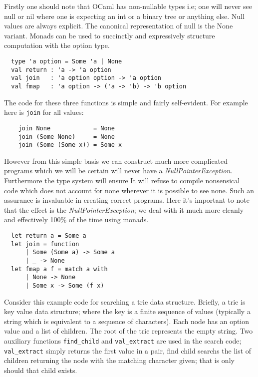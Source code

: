 Firstly one should note that OCaml has non-nullable types
i.e; one will never see null or nil where one is expecting an
int or a binary tree or anything else.
Null values are always explicit.
The canonical representation of null is the None variant.
Monads can be used to succinctly and expressively structure computation with the option type.

\begin{verbatim}
  type 'a option = Some 'a | None
  val return : 'a -> 'a option
  val join   : 'a option option -> 'a option
  val fmap   : 'a option -> ('a -> 'b) -> 'b option
\end{verbatim}

The code for these three functions is simple and fairly self-evident.
For example here is \texttt{join} for all values:
\begin{verbatim}
    join None            = None
    join (Some None)     = None
    join (Some (Some x)) = Some x
\end{verbatim}

However from this simple basis we can construct much more complicated programs which we
will be certain will never have a \textit{NullPointerException}.
Furthermore the type system will ensure 
It will refuse to compile nonsensical code which does not account for none
wherever it is possible to see none.
Such an assurance is invaluable in creating correct programs.
Here it's important to note that the effect is the \textit{NullPointerException};
we deal with it much more cleanly and effectively 100\% of the time using monads.

\begin{verbatim}
  let return a = Some a
  let join = function
      | Some (Some a) -> Some a
      | _ -> None
  let fmap a f = match a with
      | None -> None
      | Some x -> Some (f x)
\end{verbatim}

Consider this example code for searching a trie data structure.
Briefly, a trie is key value data structure;
where the key is a finite sequence of values
(typically a string which is equivalent to a sequence of characters).
Each node has an option value and a list of children.
The root of the trie represents the empty string.
Two auxiliary functions \texttt{find\_child} and \texttt{val\_extract}
are used in the search code; \texttt{val\_extract}
simply returns the first value in a pair,
find child searchs the list of children returning
the node with the matching character given;
that is only should that child exists.

